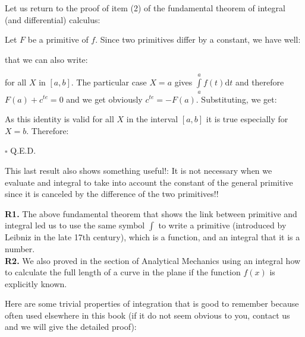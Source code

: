 	Let us return to the proof of item (2) of the fundamental theorem of integral (and differential) calculus:
	\begin{dem}
	Let $F$ be a primitive of $f$. Since two primitives differ by a constant, we have well:
	
	that we can also write:
	
	for all $X$ in $[a, b]$. The particular case $X=a$ gives $\int\limits_a^a f(t)\mathrm{d}t$ and therefore $F(a)+c^{te}=0$ and we get obviously $c^{te}=-F(a)$. Substituting, we get:
	
	As this identity is valid for all $X$ in the interval $[a,b]$ it is true especially for $X=b$. Therefore:
	
	\begin{flushright}
		$\square$  Q.E.D.
	\end{flushright}
	\end{dem}
	This last result also shows something useful!: It is not necessary when we evaluate and integral to take into account the constant of the general primitive since it is canceled by the difference of the two primitives!!
	\begin{tcolorbox}[title=Remarks,colframe=black,arc=10pt]
	\textbf{R1.} The above fundamental theorem that shows the link between primitive and integral led us to use the same symbol $\int$ to write a primitive (introduced by Leibniz in the late 17th century), which is a function, and an integral that it is a number.\\
	
	\textbf{R2.} We also proved in the section of Analytical Mechanics using an integral how to calculate the full length of a curve in the plane if the function $f(x)$ is explicitly known.
	\end{tcolorbox}
	Here are some trivial properties of integration that is good to remember because often used elsewhere in this book (if it do not seem obvious to you, contact us and we will give the detailed proof):
